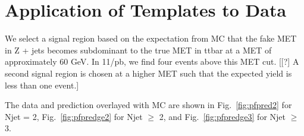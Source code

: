 
\section{Application of Templates to Data}
\label{sec:data}

We select a signal region based on the expectation from MC that the fake MET in Z + jets becomes subdominant to the true MET in ttbar at a MET of approximately 60 GeV. In 11/pb, we find four events above this MET cut. [[?] A second signal region is chosen at a higher MET such that the expected yield is less than one event.]

The data and prediction overlayed with MC are shown in Fig.~\ref{fig:pfpred2} for Njet = 2, Fig.~\ref{fig:pfpredge2} for Njet $\ge$ 2, and Fig.~\ref{fig:pfpredge3} for Njet $\ge$ 3.


